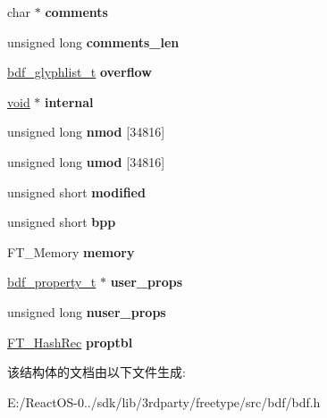 \begin{DoxyCompactItemize}
char $\ast$ {\bfseries comments}
\item 
\mbox{\label{structbdf__font__t___aa19a7ff59b980de1dde381f58604776b}} 
unsigned long {\bfseries comments\+\_\+len}
\item 
\mbox{\label{structbdf__font__t___a4431c55ce3c6e10aeaa1cc98a8b83da6}} 
\hyperlink{structbdf__glyphlist__t__}{bdf\+\_\+glyphlist\+\_\+t} {\bfseries overflow}
\item 
\mbox{\label{structbdf__font__t___a24c05f97dc9c91f48345819076149c8d}} 
\hyperlink{interfacevoid}{void} $\ast$ {\bfseries internal}
\item 
\mbox{\label{structbdf__font__t___a085fe9dff646a8ebe4a14af896beb763}} 
unsigned long {\bfseries nmod} \mbox{[}34816\mbox{]}
\item 
\mbox{\label{structbdf__font__t___abf9b6aaf74eff6b13f0e69f91b35e6b5}} 
unsigned long {\bfseries umod} \mbox{[}34816\mbox{]}
\item 
\mbox{\label{structbdf__font__t___a8466846de62a242cb6dab486340a38ba}} 
unsigned short {\bfseries modified}
\item 
\mbox{\label{structbdf__font__t___a8530eb34ba97eddfde7debeb434c6398}} 
unsigned short {\bfseries bpp}
\item 
\mbox{\label{structbdf__font__t___a897bd6bf78b5d2105f01225b587de0e5}} 
F\+T\+\_\+\+Memory {\bfseries memory}
\item 
\mbox{\label{structbdf__font__t___aff96795d8125297f162adf20f402fac8}} 
\hyperlink{structbdf__property__t__}{bdf\+\_\+property\+\_\+t} $\ast$ {\bfseries user\+\_\+props}
\item 
\mbox{\label{structbdf__font__t___a4c36cc0c004f96e8f8006d4f66e24650}} 
unsigned long {\bfseries nuser\+\_\+props}
\item 
\mbox{\label{structbdf__font__t___a68b2d367497be88233964d04e68e3c83}} 
\hyperlink{struct_f_t___hash_rec__}{F\+T\+\_\+\+Hash\+Rec} {\bfseries proptbl}
\end{DoxyCompactItemize}


该结构体的文档由以下文件生成\+:\begin{DoxyCompactItemize}
\item 
E\+:/\+React\+O\+S-\/0../sdk/lib/3rdparty/freetype/src/bdf/bdf.\+h\end{DoxyCompactItemize}

